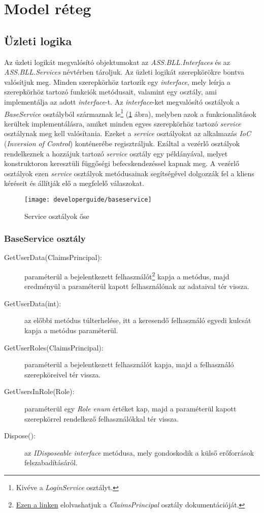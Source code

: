 \section{Model réteg}
\label{sec:model}
\subsection{Üzleti logika}
Az üzleti logikát megvalósító objektumokat az \emph{ASS.BLL.Interfaces} és az \emph{ASS.BLL.Services} névtérben tároljuk. Az üzleti logikát szerepkörökre bontva valósítjuk meg. Minden szerepkörhöz tartozik egy \emph{interface}, mely leírja a szerepkörhöz tartozó funkciók metódusait, valamint egy osztály, ami implementálja az adott \emph{interface}-t. Az \emph{interface}-ket megvalósító osztályok a \emph{BaseService} osztályból származnak le\footnote{Kivéve a \emph{LoginService} osztályt.} (\ref{fig:bll-baseservice} ábra), melyben azok a funkcionalitások kerültek implementálásra, amiket minden egyes szerepkörhöz tartozó \emph{service} osztálynak meg kell valósítania. Ezeket a \emph{service} osztályokat az alkalmazás \emph{IoC} (\emph{Inversion of Control}) konténerébe \cite{IoC} regisztráljuk. Ezáltal a vezérlő osztályok rendelkeznek a hozzájuk tartozó \emph{service} osztály egy példányával, melyet konstruktoron keresztüli függőségi befecskendezéssel kapnak meg. A vezérlő osztályok ezen \emph{service} osztályok metódusainak segítségével dolgozzák fel a kliens kéréseit és állítják elő a megfelelő válaszokat.
\begin{figure}[H]
	\centering
	\texttt{[image: developerguide/baseservice]}
	\caption{Service osztályok őse}
	\label{fig:bll-baseservice}
\end{figure}
\subsubsection{BaseService osztály}
\begin{description}
	\item[GetUserData(ClaimsPrincipal):] paraméterül a bejelentkezett felhasználót\footnote{\href{https://docs.microsoft.com/en-us/dotnet/api/system.security.claims.claimsprincipal?view=netcore-3.1}{Ezen a linken} elolvashatjuk a \emph{ClaimsPrincipal} osztály dokumentációját.} kapja a metódus, majd eredményül a paraméterül kapott felhasználónak az adataival tér vissza.
	\item[GetUserData(int):] az előbbi metódus túlterhelése, itt a keresendő felhasználó egyedi kulcsát kapja a metódus paraméterül.
	\item[GetUserRoles(ClaimsPrincipal):] paraméterül a bejelentkezett felhasználót kapja, majd a felhasználó szerepköreivel tér vissza.
	\item[GetUsersInRole(Role):] paraméterül egy \emph{Role enum} értéket kap, majd a paraméterül kapott szerepkörrel rendelkező felhasználókkal tér vissza.
	\item[Dispose():] az \emph{IDisposeable interface} metódusa, mely gondoskodik a külső erőforrások felszabadításáról.
\end{description}
